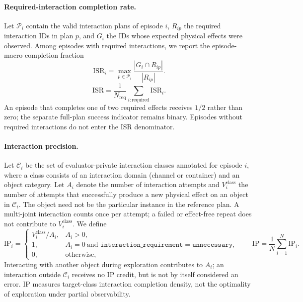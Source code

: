 \paragraph{Required-interaction completion rate.}
Let $\mathcal{P}_i$ contain the valid interaction plans of episode $i$,
$R_{ip}$ the required interaction IDs in plan $p$, and $G_i$ the IDs whose
expected physical effects were observed. Among episodes with required
interactions, we report the episode-macro completion fraction
\begin{equation}
\mathrm{ISR}_i=\max_{p\in\mathcal{P}_i}\frac{|G_i\cap R_{ip}|}{|R_{ip}|}.
\end{equation}
\begin{equation}
\mathrm{ISR}=\frac{1}{N_{\mathrm{req}}}\sum_{i:\mathrm{required}}\mathrm{ISR}_i.
\end{equation}
An episode that completes one of two required effects receives $1/2$ rather
than zero; the separate full-plan success indicator remains binary. Episodes
without required interactions do not enter the ISR denominator.

\paragraph{Interaction precision.}
Let $\mathcal C_i$ be the set of evaluator-private interaction classes
annotated for episode $i$, where a class consists of an interaction domain
(channel or container) and an object category. Let $A_i$ denote the number of
interaction attempts and $V_i^{\mathrm{class}}$ the number of attempts that
successfully produce a new physical effect on an object in $\mathcal C_i$.
The object need not be the particular instance in the reference plan. A
multi-joint interaction counts once per attempt; a failed or effect-free
repeat does not contribute to $V_i^{\mathrm{class}}$. We define
\begin{equation}
\mathrm{IP}_i =
\begin{cases}
V_i^{\mathrm{class}}/A_i, & A_i>0,\\
1, & A_i=0\ \text{and }\texttt{interaction\_requirement}=\texttt{unnecessary},\\
0, & \text{otherwise},
\end{cases}
\qquad
\mathrm{IP}=\frac{1}{N}\sum_{i=1}^{N}\mathrm{IP}_i.
\end{equation}
Interacting with another object during exploration contributes to $A_i$;
an interaction outside $\mathcal C_i$ receives no IP credit, but is not by
itself considered an error. IP measures target-class interaction completion
density, not the optimality of exploration under partial observability.

